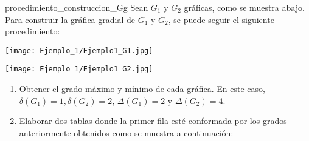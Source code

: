 \documentclass[fleqn, 11pt]{beamer}
\begin{document}
    \begin{ejemplo}[breakable, pad at break = 4mm, beforeafter skip = 3mm]{}{procedimiento_construccion_Gg}
        Sean $ G_1 $ y $ G_2 $ gráficas, como se muestra abajo. Para construir la gráfica gradial de $ G_1 $ y $ G_2 $, se puede seguir el siguiente procedimiento: \vspace{3mm}

        \begin{center}
            \begin{minipage}[h]{0.3\linewidth}
                \texttt{[image: Ejemplo\_1/Ejemplo1\_G1.jpg]}
            \end{minipage} \hspace{0.1\linewidth}
            \begin{minipage}[h]{0.3\linewidth}
                \texttt{[image: Ejemplo\_1/Ejemplo1\_G2.jpg]}
            \end{minipage}
        \end{center} \vspace{3mm}

        \begin{enumerate}[1.]
            \item Obtener el grado máximo y mínimo de cada gráfica. En este caso, $ \delta(G_1) = 1, \delta(G_2) = 2 $, \mbox{$ \Delta(G_1) = 2 $} y $ \Delta(G_2) = 4 $. \vspace{3mm}
            \item Elaborar dos tablas donde la primer fila esté conformada por los grados anteriormente obtenidos como se muestra a continuación: \vspace{3mm}
            

\end{enumerate}
\end{ejemplo}
\end{document}

